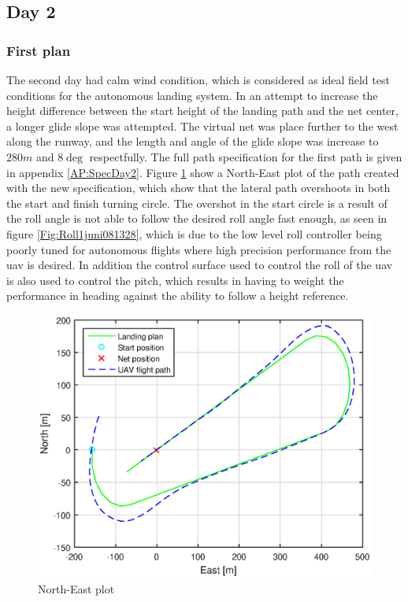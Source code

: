 \subsection{Day 2}
\subsubsection{First plan}\label{sss:Day2FirstPlan}
The second day had calm wind condition, which is considered as ideal field test conditions for the autonomous landing system. In an attempt to increase the height difference between the start height of the landing path and the net center, a longer glide slope was attempted. The virtual net was place further to the west along the runway, and the length and angle of the glide slope was increase to $280 m$ and $8 \deg$ respectfully. The full path specification for the first path is given in appendix \ref{AP:SpecDay2}. Figure \ref{Fig:NorthEast1juni081328} show a North-East plot of the path created with the new specification, which show that the lateral path overshoots in both the start and finish turning circle. The overshot in the start circle is a result of the roll angle is not able to follow the desired roll angle fast enough, as seen in figure \ref{Fig:Roll1juni081328}, which is due to the low level roll controller being poorly tuned for autonomous flights where high precision performance from the \gls{uav} is desired. In addition the control surface used to control the roll of the \gls{uav} is also used to control the pitch, which results in having to weight the performance in heading against the ability to follow a height reference.
\begin{figure}[H]
\centering
\includegraphics[scale=0.7]{figs/Experiment/NorthEast1juni081328.eps}
\caption{North-East plot}
\label{Fig:NorthEast1juni081328}
\end{figure}

